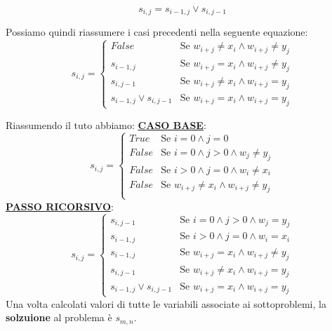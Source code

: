 \documentclass[12pt]{article}
\begin{document}
\begin{itemize}
\begin{itemize}
        $$s_{i,j} = s_{i-1, j} \vee s_{i, j-1}$$
    \end{itemize}
    Possiamo quindi riassumere i casi precedenti nella seguente equazione:
    \begin{equation*}
        s_{i,j} = \begin{cases}
            False & \textrm{Se } w_{i+j} \neq x_i \land w_{i+j} \neq y_j \\
            s_{i-1, j} & \textrm{Se } w_{i+j} = x_i \land w_{i+j} \neq y_j \\
            s_{i, j-1} & \textrm{Se } w_{i+j} \neq x_i \land w_{i+j} = y_j \\
            s_{i-1, j} \vee s_{i, j-1} & \textrm{Se } w_{i+j} = x_i \land w_{i+j} = y_j
        \end{cases}
    \end{equation*}
\end{itemize}
Riassumendo il tuto abbiamo: \newline
\textbf{\underline{CASO BASE}}:
\begin{equation*}
    s_{i,j} = \begin{cases}
        True & \textrm{Se } i = 0 \land j = 0 \\
        False & \textrm{Se } i = 0 \land j > 0  \land w_j \neq y_j\\
        False & \textrm{Se } i > 0 \land j = 0 \land w_i \neq x_i \\
        False & \textrm{Se } w_{i+j} \neq x_i \land w_{i+j} \neq y_j \\
    \end{cases}
\end{equation*}
\textbf{\underline{PASSO RICORSIVO}}:
\begin{equation*}
    s_{i,j} = \begin{cases}
        s_{i, j-1} & \textrm{Se } i = 0 \land j > 0 \land w_j = y_j \\
        s_{i-1, j} & \textrm{Se } i > 0 \land j = 0 \land w_i = x_i \\
        s_{i-1, j} & \textrm{Se } w_{i+j} = x_i \land w_{i+j} \neq y_j \\
        s_{i, j-1} & \textrm{Se } w_{i+j} \neq x_i \land w_{i+j} = y_j \\
        s_{i-1, j} \vee s_{i, j-1} & \textrm{Se } w_{i+j} = x_i \land w_{i+j} = y_j
    \end{cases}
\end{equation*}
Una volta calcolati valori di tutte le variabili associate ai sottoproblemi, la \textbf{solzuione} al problema è $s_{m,n}$. \newline
\end{document}
